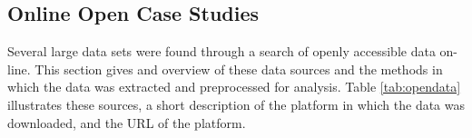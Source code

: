 \subsection{Online Open Case Studies}

Several large data sets were found through a search of openly accessible data on-line. This section gives and overview of these data sources and the methods in which the data was extracted and preprocessed for analysis. Table \ref{tab:opendata} illustrates these sources, a short description of the platform in which the data was downloaded, and the URL of the platform.

